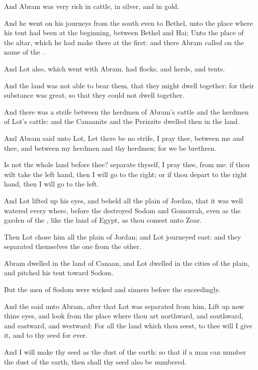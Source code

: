 \verse And Abram was very rich in cattle, in silver, and in gold.

\verse And he went on his journeys from the south even to Bethel, unto the place where his tent had been at the beginning, between Bethel and Hai; \verse Unto the place of the altar, which he had make there at the first: and there Abram called on the name of the \LORD.

\verse And Lot also, which went with Abram, had flocks, and herds, and tents.

\verse And the land was not able to bear them, that they might dwell together: for their substance was great, so that they could not dwell together.

\verse And there was a strife between the herdmen of Abram's cattle and the herdmen of Lot's cattle: and the Canaanite and the Perizzite dwelled then in the land.

\verse And Abram said unto Lot, Let there be no strife, I pray thee, between me and thee, and between my herdmen and thy herdmen; for we be brethren.

\verse Is not the whole land before thee? separate thyself, I pray thee, from me: if thou wilt take the left hand, then I will go to the right; or if thou depart to the right hand, then I will go to the left.

\verse And Lot lifted up his eyes, and beheld all the plain of Jordan, that it was well watered every where, before the \LORD destroyed Sodom and Gomorrah, even as the garden of the \LORD, like the land of Egypt, as thou comest unto Zoar.

\verse Then Lot chose him all the plain of Jordan; and Lot journeyed east: and they separated themselves the one from the other.

\verse Abram dwelled in the land of Canaan, and Lot dwelled in the cities of the plain, and pitched his tent toward Sodom.

\verse But the men of Sodom were wicked and sinners before the \LORD exceedingly.

\verse And the \LORD said unto Abram, after that Lot was separated from him, Lift up now thine eyes, and look from the place where thou art northward, and southward, and eastward, and westward: \verse For all the land which thou seest, to thee will I give it, and to thy seed for ever.

\verse And I will make thy seed as the dust of the earth: so that if a man can number the dust of the earth, then shall thy seed also be numbered.

